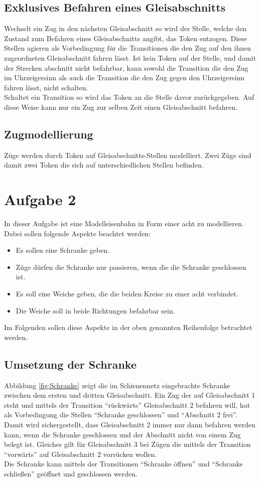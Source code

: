 \documentclass[10pt]{scrartcl}
\begin{document}
\subsection{Exklusives Befahren eines Gleisabschnitts}
Wechselt ein Zug in den nächsten Gleisabschnitt so wird der Stelle, welche den Zustand zum Befahren eines Gleisabschnitts angibt, das Token entzogen.
Diese Stellen agieren als Vorbedingung für die Transitionen die den Zug auf den ihnen zugeordneten Gleisabschnitt fahren lässt.
Ist kein Token auf der Stelle, und damit der Strecken abschnitt nicht befahrbar, kann sowohl die Transition die den Zug im Uhrzeigersinn als auch die Transition die den Zug gegen den Uhrzeigersinn fahren lässt, nicht schalten.\\
Schaltet ein Transition so wird das Token an die Stelle davor zurückgegeben.
Auf diese Weise kann nur ein Zug zur selben Zeit einen Gleisabschnitt befahren.

\subsection{Zugmodellierung}
Züge werden durch Token auf Gleisabschnitts-Stellen modelliert.
Zwei Züge sind damit zwei Token die sich auf unterschiedlichen Stellen befinden.

\section{Aufgabe 2}
In dieser Aufgabe ist eine Modelleisenbahn in Form einer acht zu modellieren.
Dabei sollen folgende Aspekte beachtet werden:
\begin{itemize}
	\item Es sollen eine Schranke geben.
	\item Züge dürfen die Schranke nur passieren, wenn die die Schranke geschlossen ist.
	\item Es soll eine Weiche geben, die die beiden Kreise zu einer acht verbindet.
	\item Die Weiche soll in beide Richtungen befahrbar sein.
\end{itemize}
Im Folgenden sollen diese Aspekte in der oben genannten Reihenfolge betrachtet werden.

\subsection{Umsetzung der Schranke}
Abbildung \ref{fig:Schranke} zeigt die im Schienennetz eingebrachte Schranke zwischen dem ersten und dritten Gleisabschnitt. Ein Zug der auf Gleisabschnitt 1 steht und mittels der Transition "`rückwärts"' Gleisabschnitt 2 befahren will, hat als Vorbedingung die Stellen "`Schranke geschlossen"' und "`Abschnitt 2 frei"'. Damit wird sichergestellt, dass Gleisabschnitt 2 immer nur dann befahren werden kann, wenn die Schranke geschlossen und der Abschnitt nicht von einem Zug belegt ist. Gleiches gilt für Gleisabschnitt 3 bei Zügen die mittels der Transition "`vorwärts"' auf Gleisabschnitt 2 vorrücken wollen.\\
Die Schranke kann mittels der Transitionen "`Schranke öffnen"' und "`Schranke schließen"' geöffnet und geschlossen werden.
 
\end{document}
